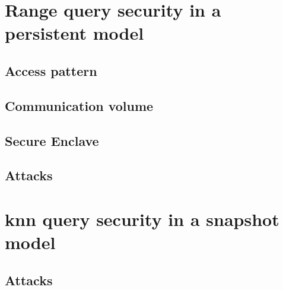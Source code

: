 	\section{Range query security in a persistent model}

		\subsection{Access pattern}

		\subsection{Communication volume}

		\subsection{Secure Enclave}

		\subsection{Attacks}

	\section{\acrshort{knn} query security in a snapshot model}

		\subsection{Attacks}
